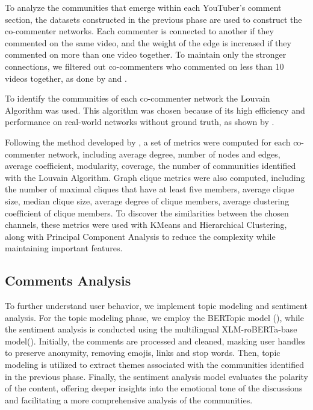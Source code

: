 \documentclass[sigconf]{acmart}
\begin{document}
To analyze the communities that emerge within each YouTuber's comment section, the datasets constructed 
in the previous phase are used to construct the co-commenter networks. Each commenter is connected to
another if they commented on the same video, and the weight of the edge is increased if they commented
on more than one video together. To maintain only the stronger connections, we filtered out co-commenters
who commented on less than 10 videos together, as done by \cite{shajari2023} and \cite{kirdemir2023}. 

To identify the communities of each co-commenter network the Louvain Algorithm was used. This 
algorithm was chosen because of its high efficiency and performance on real-world networks
without ground truth, as shown by \cite{YOU2020104822}.

Following the method developed by \cite{kirdemir2023}, a set of metrics were computed 
for each co-commenter network, including average degree, number of nodes and edges, average coefficient,
modularity, coverage, the number of communities identified with the Louvain Algorithm. Graph clique 
metrics were also computed, including the number of maximal cliques that have at least five members, 
average clique size, median clique size, average degree of clique members, average clustering coefficient
of clique members. To discover the similarities between the chosen channels, these metrics were used
with KMeans and Hierarchical Clustering, along with Principal Component Analysis to reduce the complexity
while maintaining important features.

\subsection{Comments Analysis}

To further understand user behavior, we implement
topic modeling and sentiment analysis. For the topic modeling phase, we employ the BERTopic model 
(\cite{bertopic2022}), while the sentiment analysis is conducted using the multilingual 
XLM-roBERTa-base model(\cite{barbieri-etal-2022-xlm}). 
Initially, the comments are processed and cleaned, masking user handles to preserve anonymity,
removing emojis, links and stop words.
Then, topic modeling is utilized to extract themes associated with the communities identified in the 
previous phase. Finally, the sentiment analysis model evaluates the polarity of the content, 
offering deeper insights into the emotional tone of the discussions and facilitating a more 
comprehensive analysis of the communities.
\end{document}

